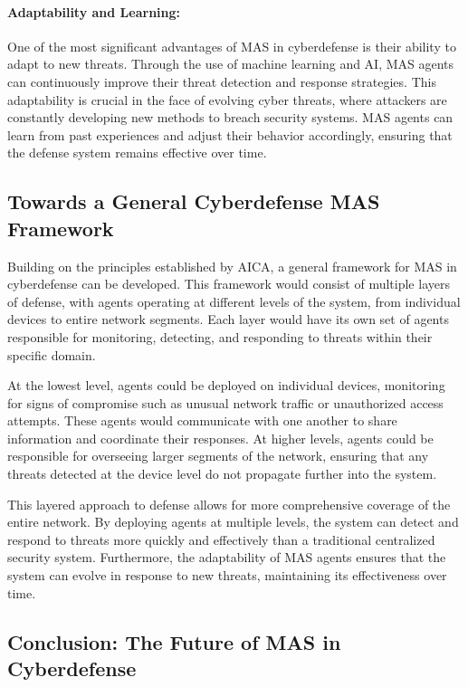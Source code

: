 \paragraph{Adaptability and Learning:}
One of the most significant advantages of MAS in cyberdefense is their ability to adapt to new threats. Through the use of machine learning and AI, MAS agents can continuously improve their threat detection and response strategies. This adaptability is crucial in the face of evolving cyber threats, where attackers are constantly developing new methods to breach security systems. MAS agents can learn from past experiences and adjust their behavior accordingly, ensuring that the defense system remains effective over time.

\subsection{Towards a General Cyberdefense MAS Framework}

Building on the principles established by AICA, a general framework for MAS in cyberdefense can be developed. This framework would consist of multiple layers of defense, with agents operating at different levels of the system, from individual devices to entire network segments. Each layer would have its own set of agents responsible for monitoring, detecting, and responding to threats within their specific domain.

At the lowest level, agents could be deployed on individual devices, monitoring for signs of compromise such as unusual network traffic or unauthorized access attempts. These agents would communicate with one another to share information and coordinate their responses. At higher levels, agents could be responsible for overseeing larger segments of the network, ensuring that any threats detected at the device level do not propagate further into the system.

This layered approach to defense allows for more comprehensive coverage of the entire network. By deploying agents at multiple levels, the system can detect and respond to threats more quickly and effectively than a traditional centralized security system. Furthermore, the adaptability of MAS agents ensures that the system can evolve in response to new threats, maintaining its effectiveness over time.

\subsection{Conclusion: The Future of MAS in Cyberdefense}

